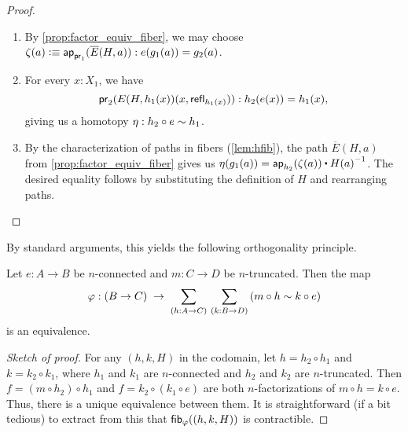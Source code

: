 \begin{proof}
\begin{enumerate}
\item By \autoref{prop:factor_equiv_fiber}, we may choose
  $\zeta(a) \vcentcolon\equiv \mathsf{ap}_{\mathsf{pr}_{1}}(\overline E(H,a)) : e(g_1(a)) = g_2(a)$.
  \label{item:orth-fact-2}
\item For every $x:X_1$, we have
\begin{equation*}
\mathsf{pr}_{2}(E(H,h_1(x))({x,\mathsf{refl}_{h_1(x)}})) :h_2(e(x))= h_1(x),
\end{equation*}
giving us a homotopy $\eta:h_2\circ e\sim h_1$.
\item By the characterization of paths in fibers (\autoref{lem:hfib}), the path $\overline E(H,a)$ from \autoref{prop:factor_equiv_fiber} gives us
  $\eta(g_1(a)) = \apfunc{h_2}(\zeta(a)) \ct \opp{H(a)}$.
  The desired equality follows by substituting the definition of $H$ and rearranging paths.\qedhere
\end{enumerate}
\end{proof}

%

By standard arguments, this yields the following orthogonality principle.

\begin{thm}
  Let $e:A\to B$ be $n$-connected and $m:C\to D$ be $n$-truncated.
  Then the map
  \[ \varphi: (B\to C) \;\to\; \sm{h:A\to C}{k:B\to D} (m\circ h \htpy k \circ e) \]
  is an equivalence.
\end{thm}
\begin{proof}[Sketch of proof]
  For any $(h,k,H)$ in the codomain, let $h = h_2 \circ h_1$ and $k = k_2 \circ k_1$, where $h_1$ and $k_1$ are $n$-connected and $h_2$ and $k_2$ are $n$-truncated.
  Then $f = (m\circ h_2) \circ h_1$ and $f = k_2 \circ (k_1\circ e)$ are both $n$-factorizations of $m \circ h = k\circ e$.
  Thus, there is a unique equivalence between them.
  It is straightforward (if a bit tedious) to extract from this that ${\mathsf{fib}}_{\varphi}((h,k,H))$ is contractible.
\end{proof}

%
%

